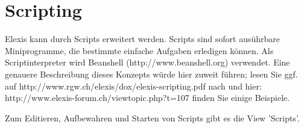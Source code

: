 %

\section{Scripting}
\label{Script}
Elexis kann durch Scripts erweitert werden. Scripts sind sofort ausührbare Miniprogramme, die bestimmte einfache Aufgaben erledigen können. Als Scriptinterpreter wird Beanshell (http://www.beanshell.org) verwendet. Eine genauere Beschreibung dieses Konzepts würde hier zuweit führen; lesen Sie ggf. auf http://www.rgw.ch/elexis/dox/elexis-scripting.pdf nach und hier: http://www.elexis-forum.ch/viewtopic.php?t=107 finden Sie einige Beispiele.

\bigskip
Zum Editieren, Aufbewahren und Starten von Scripts gibt es die View 'Scripts'.

